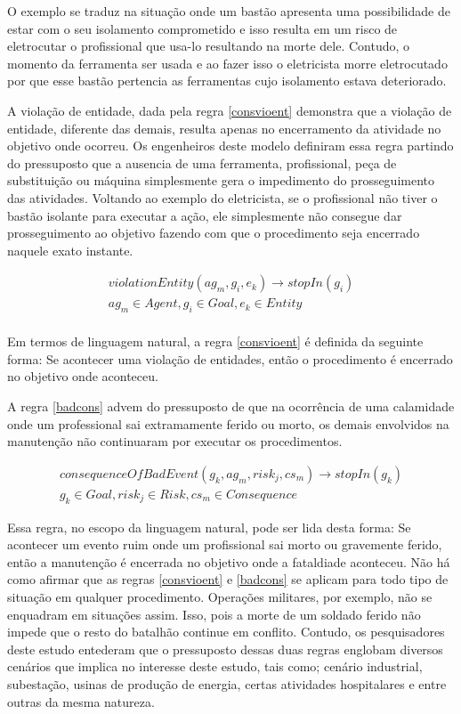 O exemplo se traduz na situação onde um bastão apresenta uma possibilidade de estar com o seu isolamento comprometido e isso resulta em um risco 
de eletrocutar o profissional que usa-lo resultando na morte dele. Contudo, o momento da ferramenta ser usada e ao fazer isso o eletricista morre eletrocutado 
por que esse bastão pertencia as ferramentas cujo isolamento estava deteriorado. 

A violação de entidade, dada pela regra \ref{consvioent} demonstra que a violação de entidade, diferente das demais, resulta apenas no encerramento 
da atividade no objetivo onde ocorreu. Os engenheiros deste modelo definiram essa regra partindo do pressuposto que a ausencia de uma ferramenta, profissional, 
peça de substituição ou máquina simplesmente gera o impedimento do prosseguimento das atividades. Voltando ao exemplo do eletricista, se o profissional 
não tiver o bastão isolante para executar a ação, ele simplesmente não consegue dar prosseguimento ao objetivo fazendo com que o procedimento seja 
encerrado naquele exato instante. 

\begin{eqnarray}\label{consvioent}
	violationEntity(ag_m,g_i,e_k) \to stopIn(g_i) \nonumber \\  
    ag_m \in Agent, g_i \in Goal, e_k \in Entity \\ \nonumber
\end{eqnarray}

Em termos de linguagem natural, a regra \ref{consvioent} é definida da seguinte forma: Se acontecer uma violação de entidades, então o procedimento 
é encerrado no objetivo onde aconteceu. 

A regra \ref{badcons} advem do pressuposto de que na ocorrência de uma calamidade onde um professional sai extramamente ferido ou morto, os demais 
envolvidos na manutenção não continuaram por executar os procedimentos. 
 
 \begin{eqnarray}\label{badcons}
	consequenceOfBadEvent(g_k,ag_m,risk_j,cs_m) \to stopIn(g_k) \nonumber \\ 
    g_k \in Goal, risk_j \in Risk, cs_m \in Consequence
\end{eqnarray}

Essa regra, no escopo da linguagem natural, pode ser lida desta forma: Se acontecer um evento ruim onde um profissional sai morto ou gravemente ferido, 
então a manutenção é encerrada no objetivo onde a fataldiade aconteceu. Não há como afirmar que as regras  \ref{consvioent} e \ref{badcons} se aplicam 
para todo tipo de situação em qualquer procedimento. Operações militares, por exemplo, não se enquadram em situações assim. Isso, pois a morte de um 
soldado ferido não impede que o resto do batalhão continue em conflito. Contudo, os pesquisadores deste estudo entederam que o pressuposto dessas 
duas regras englobam diversos cenários que implica no interesse deste estudo, tais como; cenário industrial, subestação, usinas de produção de energia, 
certas atividades hospitalares e entre outras da mesma natureza.  

